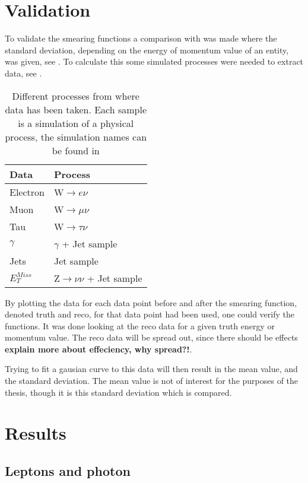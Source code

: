 \section{Validation}\label{sec:vali}
To validate the smearing functions a comparison with \citep{ATL-PHYS-PUB-2013-004} was made where the standard deviation, depending on the energy of momentum value of an entity, was given, see . To calculate this some simulated processes were needed to extract data, see . 
\begin{SCtable}[][ht]
\begin{tabular}{|l|l|}
\hline
Data & Process \\ \hline
Electron & W$\rightarrow e\nu$ \\
Muon & W$\rightarrow \mu \nu$ \\
Tau & W$\rightarrow \tau \nu$ \\
$\gamma$ & $\gamma$ + Jet sample \\
Jets & Jet sample \\
$E_T^{Miss}$ & Z$\rightarrow \nu \nu$ + Jet sample \\ \hline
\end{tabular}
\caption{Different processes from where data has been taken. Each sample is a simulation of a physical process, the simulation names can be found in }
\label{tab:backproc}
\end{SCtable}

By plotting the data for each data point before and after the smearing function, denoted truth and reco, for that data point had been used, one could verify the functions. It was done looking at the reco data for a given truth energy or momentum value. The reco data will be spread out, since there should be effects \textbf{explain more about effeciency, why spread?!}. 

Trying to fit a gausian curve to this data will then result in the mean value, and the standard deviation. The mean value is not of interest for the purposes of the thesis, though it is this standard deviation which is compared. 


\section{Results}\label{cha:vali:sec:results}
\subsection{Leptons and photon}
